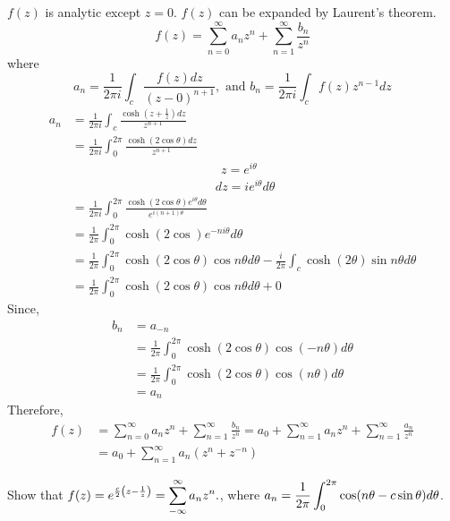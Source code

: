\begin{solution}
$f(z)$ is analytic except $z=0$. $f(z)$ can be expanded by Laurent's theorem.
\[f(z) =\sum_{n=0}^{\infty}a_{n}z^{n}+\sum_{n=1}^{\infty}\frac{b_{n}}{z^{n}}\]
where
\[a_{n}=\frac{1}{2\pi i}\int_c \frac{f(z)dz}{(z-0)^{n+1}}, \text{ and } b_{n}=\frac{1}{2\pi i}\int_c f(z)z^{n-1}dz
\]
\begin{align*}
a_n&=\frac{1}{2\pi i}\int_{c}\frac{\cosh(z+\frac{1}{z})dz}{z^{n+1}} \\
&=\frac{1}{2\pi i}\int_{0}^{2\pi}\frac{\cosh(2\cos\theta)dz}{z^{n+1}} \\
&~~~~~~~~~~~~~~~~~~~~~~~~~~~~~~~~~~~~~~~~~~~~~~~~~~~~~~z=e^{i\theta} \\
&~~~~~~~~~~~~~~~~~~~~~~~~~~~~~~~~~~~~~~~~~~~~~~~~~~~~dz=ie^{i\theta}d\theta \\
&=\frac{1}{2\pi i}\int_{0}^{2\pi}\frac{\cosh(2\cos\theta)e^{i\theta}  d\theta}{e^{i(n+1)\theta}} \\
&=\frac{1}{2\pi}\int_{0}^{2\pi}\cosh(2\cos)e^{-ni\theta}d\theta \\
&=\frac{1}{2\pi}\int_{0}^{2\pi}\cosh(2\cos\theta)\cos n\theta d\theta-\frac{i}{2\pi}\int_{c}\cosh(2\theta)\sin n\theta d\theta \\
&=\frac{1}{2\pi}\int_{0}^{2\pi}\cosh(2\cos\theta)\cos n\theta d\theta+0 
\end{align*}
Since,
\begin{align*}
	b_n &=a_{-n}\\
	 &=\frac{1}{2\pi}\int_{0}^{2\pi}\cosh(2\cos\theta)\cos(-n\theta)d\theta \\
	 &=\frac{1}{2\pi}\int_{0}^{2\pi}\cosh(2\cos\theta)\cos(n\theta)d\theta \\
	 &=a_n
\end{align*}
Therefore,
\begin{align*}
	f(z)&=\sum_{n=0}^{\infty}a_{n}z^{n}+\sum_{n=1}^{\infty}\frac{b_{n}}{z^{n}} =a_0 + \sum_{n=1}^{\infty}a_{n}z^{n}+\sum_{n=1}^{\infty}\frac{a_{n}}{z^{n}} \\
	&=a_0 + \sum_{n=1}^{\infty}a_{n}(z^{n}+z^{-n})
\end{align*}
\end{solution}
\begin{example}
Show that  $\displaystyle f(z) = e^{\frac{c}{2}\left(z-\frac{1}{z}\right)} = \sum_{-\infty}^\infty a_nz^n.$, where $\displaystyle a_n=\frac{1}{2\pi}\int_{0}^{2\pi} \cos(n\theta - c \sin \theta) d\theta $.
\end{example}
